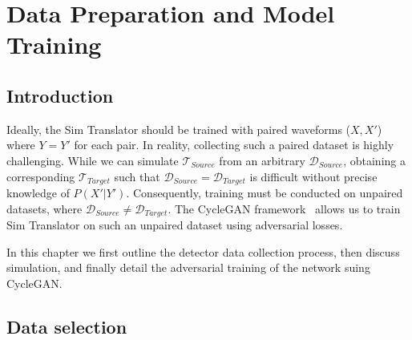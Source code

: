 \chapter{Data Preparation and Model Training}\label{chap:training}

\section{Introduction}
Ideally, the Sim Translator should be trained with paired waveforms ($X, X'$) where $Y=Y'$ for each pair. In reality, collecting such a paired dataset is highly challenging. While we can simulate $\mathcal{T}_{Source}$ from an arbitrary $\mathcal{D}_{Source}$, obtaining a corresponding $\mathcal{T}_{Target}$ such that $\mathcal{D}_{Source} = \mathcal{D}_{Target}$ is difficult without precise knowledge of $P(X'|Y')$. Consequently, training must be conducted on unpaired datasets, where $\mathcal{D}_{Source} \neq \mathcal{D}_{Target}$. The CycleGAN framework~\cite{CycleGAN} allows us to train Sim Translator on such an unpaired dataset using adversarial losses.

In this chapter we first outline the detector data collection process, then discuss simulation, and finally detail the adversarial training of the network suing CycleGAN.




\section{Data selection}




